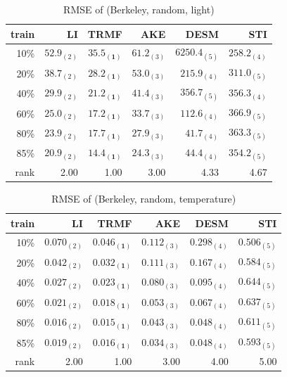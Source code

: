 \begin{table} [htbp]
\centering
\caption{RMSE of (Berkeley, random, light)}
\label{table:berkeley_random_light}
\begin{tabular}{ r |  r r r r r}
	train	&LI	&TRMF	&AKE	&DESM	&STI\\ \hline
	10\% & $ 52.9_{(2)} $ & $ \mathbf{ 35.5_{(1)} } $ & $ 61.2_{(3)} $ & $ 6250.4_{(5)} $ & $ 258.2_{(4)} $ \\
	20\% & $ 38.7_{(2)} $ & $ \mathbf{ 28.2_{(1)} } $ & $ 53.0_{(3)} $ & $ 215.9_{(4)} $ & $ 311.0_{(5)} $ \\
	40\% & $ 29.9_{(2)} $ & $ \mathbf{ 21.2_{(1)} } $ & $ 41.4_{(3)} $ & $ 356.7_{(5)} $ & $ 356.3_{(4)} $ \\
	60\% & $ 25.0_{(2)} $ & $ \mathbf{ 17.2_{(1)} } $ & $ 33.7_{(3)} $ & $ 112.6_{(4)} $ & $ 366.9_{(5)} $ \\
	80\% & $ 23.9_{(2)} $ & $ \mathbf{ 17.7_{(1)} } $ & $ 27.9_{(3)} $ & $ 41.7_{(4)} $ & $ 363.3_{(5)} $ \\
	85\% & $ 20.9_{(2)} $ & $ \mathbf{ 14.4_{(1)} } $ & $ 24.3_{(3)} $ & $ 44.4_{(4)} $ & $ 354.2_{(5)} $ \\ \hline
	rank &2.00 &1.00 &3.00 &4.33 &4.67 \\
\end{tabular}
\end{table}

\begin{table}[htbp]
\centering
\caption{RMSE of (Berkeley, random, temperature)}
\label{table:berkeley_random_tem}
\begin{tabular}{ r | r r r r r}
	train	&LI	&TRMF	&AKE	&DESM	&STI\\ \hline
	10\% & $ 0.070_{(2)} $ & $ \mathbf{ 0.046_{(1)} } $ & $ 0.112_{(3)} $ & $ 0.298_{(4)} $ & $ 0.506_{(5)} $ \\
	20\% & $ 0.042_{(2)} $ & $ \mathbf{ 0.032_{(1)} } $ & $ 0.111_{(3)} $ & $ 0.167_{(4)} $ & $ 0.584_{(5)} $ \\
	40\% & $ 0.027_{(2)} $ & $ \mathbf{ 0.023_{(1)} } $ & $ 0.080_{(3)} $ & $ 0.095_{(4)} $ & $ 0.644_{(5)} $ \\
	60\% & $ 0.021_{(2)} $ & $ \mathbf{ 0.018_{(1)} } $ & $ 0.053_{(3)} $ & $ 0.067_{(4)} $ & $ 0.637_{(5)} $ \\
	80\% & $ 0.016_{(2)} $ & $ \mathbf{ 0.015_{(1)} } $ & $ 0.043_{(3)} $ & $ 0.048_{(4)} $ & $ 0.611_{(5)} $ \\
	85\% & $ 0.019_{(2)} $ & $ \mathbf{ 0.016_{(1)} } $ & $ 0.034_{(3)} $ & $ 0.048_{(4)} $ & $ 0.593_{(5)} $ \\ \hline
	rank &2.00 &1.00 &3.00 &4.00 &5.00 \\
\end{tabular}
\end{table}

